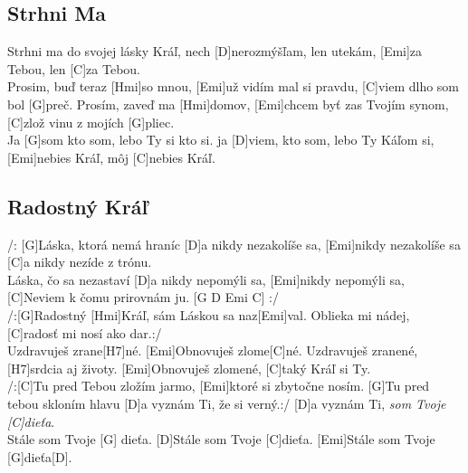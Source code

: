 \documentclass[10pt]{article}
\begin{document}
\begin{Large}
\begin{minipage}{\textwidth}
\subsection{Strhni Ma}
\begin{multicols*}{2}
\begin{guitar}
	[G]Strhni ma do svojej lásky Kráľ,
	nech [D]nerozmýšľam, len utekám,
	[Emi]za Tebou, len [C]za Tebou.
	\\
	[G]Prosim, buď teraz [Hmi]so mnou,
	[Emi]už vidím mal si pravdu,
	[C]viem dlho som bol [G]preč.
	\columnbreak
	Prosím, zaveď ma [Hmi]domov,
	[Emi]chcem byť zas Tvojím synom,
	[C]zlož vinu z mojích [G]pliec.
	\\
	Ja [G]som kto som, lebo Ty si kto si.
	ja [D]viem, kto som, lebo Ty Káľom si,
	[Emi]nebies Kráľ, môj [C]nebies Kráľ.
\end{guitar}
\end{multicols*}
\end{minipage}

\begin{minipage}{\textwidth}
\subsection{Radostný Kráľ}
\begin{multicols*}{2}
\begin{guitar}
	/:
	[G]Láska, ktorá nemá hraníc
	[D]a nikdy nezakolíše sa,
	[Emi]nikdy nezakolíše sa
	[C]a nikdy nezíde z trónu.
	\\
	[G]Láska, čo sa nezastaví
	[D]a nikdy nepomýli sa,
	[Emi]nikdy nepomýli sa,
	[C]Neviem k čomu prirovnám ju. [G D Emi C] :/ 
	\\
	/:[G]Radostný [Hmi]Kráľ,
	sám Láskou sa naz[Emi]val.
	Oblieka mi nádej,
	[C]radosť mi nosí ako dar.:/
	\\
	[G]Uzdravuješ zrane[H7]né.
	[Emi]Obnovuješ zlome[C]né. 
	\columnbreak
	[G]Uzdravuješ zranené, 
	[H7]srdcia aj životy.
	[Emi]Obnovuješ zlomené, 
	[C]taký Kráľ si Ty.
	\\
	/:[C]Tu pred Tebou zložím jarmo,
	[Emi]ktoré si zbytočne nosím.
	[G]Tu pred tebou skloním hlavu
	[D]a vyznám Ti, že si verný.:/
	[D]a vyznám Ti, \textit{som Tvoje [C]dieťa}.
	\\
	[Emi]Stále som Tvoje [G] dieťa.
	[D]Stále som Tvoje [C]dieťa.
	[Emi]Stále som Tvoje [G]dieťa[D].
\end{guitar}
\end{multicols*}
\end{minipage}



\end{Large}
\end{document}
